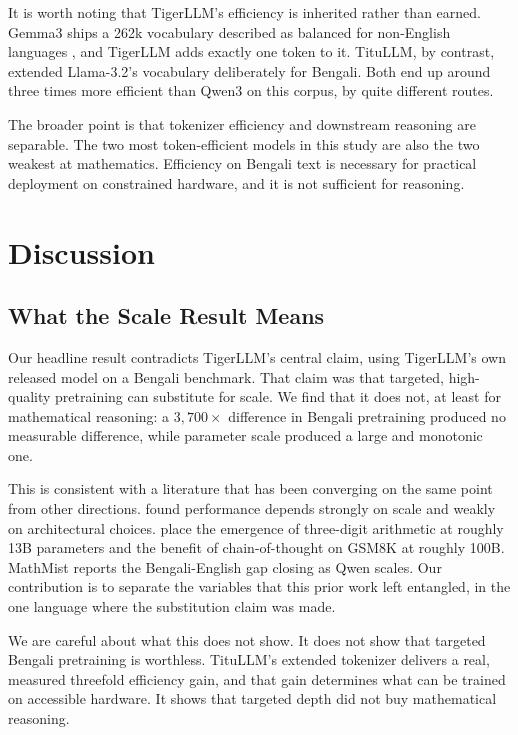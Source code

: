 \documentclass[10pt,twocolumn,letterpaper]{article}
\begin{document}
It is worth noting that TigerLLM's efficiency is inherited rather than earned.
Gemma3 ships a 262k vocabulary described as balanced for non-English languages
\parencite{gemma3}, and TigerLLM adds exactly one token to it. TituLLM, by
contrast, extended Llama-3.2's vocabulary deliberately for Bengali. Both end up
around three times more efficient than Qwen3 on this corpus, by quite different
routes.

The broader point is that tokenizer efficiency and downstream reasoning are
separable. The two most token-efficient models in this study are also the two
weakest at mathematics. Efficiency on Bengali text is necessary for practical
deployment on constrained hardware, and it is not sufficient for reasoning.


\section{Discussion}
\label{sec:discussion}

\subsection{What the Scale Result Means}

Our headline result contradicts TigerLLM's central claim, using TigerLLM's own
released model on a Bengali benchmark. That claim was that targeted,
high-quality pretraining can substitute for scale. We find that it does not, at
least for mathematical reasoning: a $3{,}700\times$ difference in Bengali
pretraining produced no measurable difference, while parameter scale produced a
large and monotonic one.

This is consistent with a literature that has been converging on the same point
from other directions. \textcite{kaplan2020scaling} found performance depends %
strongly on scale and weakly on architectural choices. \textcite{wei2022emergent} %
place the emergence of three-digit arithmetic at roughly 13B parameters and the
benefit of chain-of-thought on GSM8K at roughly 100B. MathMist
\parencite{sobhani2026mathmist} reports the Bengali-English gap closing as Qwen
scales. Our contribution is to separate the variables that this prior work left
entangled, in the one language where the substitution claim was made.

We are careful about what this does not show. It does not show that targeted
Bengali pretraining is worthless. TituLLM's extended tokenizer delivers a real,
measured threefold efficiency gain, and that gain determines what can be trained
on accessible hardware. It shows that targeted depth did not buy mathematical
reasoning.
\end{document}
